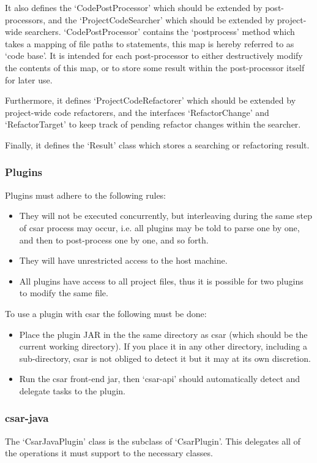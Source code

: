 \documentclass[12pt, letterpaper]{article}
\begin{document}
It also defines the `CodePostProcessor' which should be extended by post-processors, and the `ProjectCodeSearcher' which should be extended by project-wide searchers.
`CodePostProcessor' contains the `postprocess' method which takes a mapping of file paths to statements, this map is hereby referred to as `code base'.
It is intended for each post-processor to either destructively modify the contents of this map, or to store some result within the post-processor itself for later use.

Furthermore, it defines `ProjectCodeRefactorer' which should be extended by project-wide code refactorers, and the interfaces `RefactorChange'  and `RefactorTarget' to keep track of pending refactor changes within the searcher.

Finally, it defines the `Result' class which stores a searching or refactoring result.

\subsubsection{Plugins}
Plugins must adhere to the following rules:
\begin{itemize}
  \item They will not be executed concurrently, but interleaving during the same step of csar process may occur, i.e. all plugins may be told to parse one by one, and then to post-process one by one, and so forth.
  \item They will have unrestricted access to the host machine.
  \item All plugins have access to all project files, thus it is possible for two plugins to modify the same file.
\end{itemize}

To use a plugin with csar the following must be done:
\begin{itemize}
  \item Place the plugin JAR in the the same directory as csar (which should be the current working directory).
  If you place it in any other directory, including a sub-directory, csar is not obliged to detect it but it may at its own discretion.
  \item Run the csar front-end jar, then `csar-api' should automatically detect and delegate tasks to the plugin.
\end{itemize}

\subsubsection{csar-java}
The `CsarJavaPlugin' class is the subclass of `CsarPlugin'.
This delegates all of the operations it must support to the necessary classes.
\end{document}
